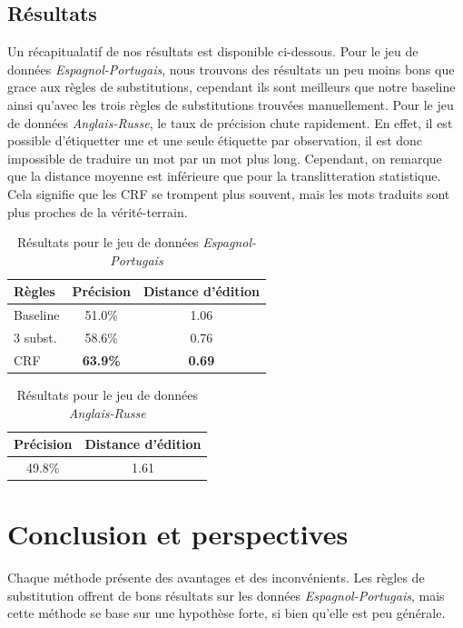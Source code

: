 \documentclass{article}
\begin{document}
\subsection{Résultats}
Un récapitualatif de nos résultats est disponible ci-dessous. Pour le jeu de données \emph{Espagnol-Portugais}, nous trouvons des résultats un peu moins bons que grace aux règles de substitutions, cependant ils sont meilleurs que notre baseline ainsi qu'avec les trois règles de substitutions trouvées manuellement. Pour le jeu de données \emph{Anglais-Russe}, le taux de précision chute rapidement. En effet, il est possible d'étiquetter une et une seule étiquette par observation, il est donc impossible de traduire un mot par un mot plus long. Cependant, on remarque que la distance moyenne est inférieure que pour la translitteration statistique. Cela signifie que les CRF se trompent plus souvent, mais les mots traduits sont plus proches de la vérité-terrain.

\begin{table}[H]
\caption{Résultats pour le jeu de données \emph{Espagnol-Portugais} }
\begin{center}
\begin{tabular}{|l|c|c|}
\hline
Règles&Précision&Distance d'édition\\
\hline
Baseline&51.0\%&1.06\\
\hline
3 subst.&58.6\%&0.76\\
\hline
CRF&\textbf{63.9\%}&\textbf{0.69}\\
\hline
\end{tabular}
\end{center}
\end{table}

\begin{table}[H]
\caption{Résultats pour le jeu de données \emph{Anglais-Russe} }
\begin{center}
\begin{tabular}{|c|c|}
\hline
Précision&Distance d'édition\\
\hline
49.8\%&1.61\\
\hline
\end{tabular}
\end{center}
\end{table}

\section{Conclusion et perspectives}
Chaque méthode présente des avantages et des inconvénients. Les règles de substitution offrent de bons résultats sur les données \emph{Espagnol-Portugais}, mais cette méthode se base sur une hypothèse forte, si bien qu'elle est peu générale.
\end{document}
